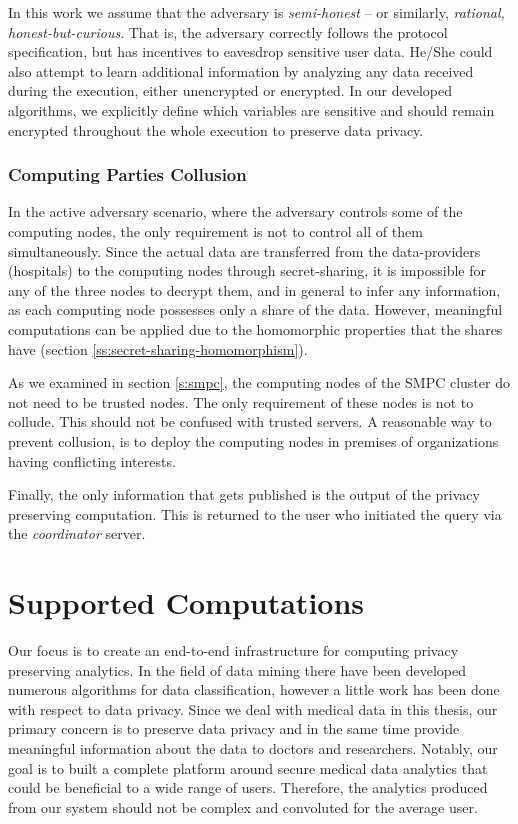 In this work we assume that the adversary is \emph{semi\hyp honest} -- or similarly, \emph{rational, honest\hyp but\hyp curious}.
That is, the adversary correctly follows the protocol specification, but has incentives to eavesdrop sensitive user data.
He/She could also attempt to learn additional information by analyzing any data received during the execution, either unencrypted or encrypted.
In our developed algorithms, we explicitly define which variables are sensitive and should remain encrypted throughout the whole execution to preserve data privacy.


\subsubsection{Computing Parties Collusion}\label{s:computing-parties-collusion}
In the active adversary scenario, where the adversary controls some of the computing nodes, the only requirement is not to control all of them simultaneously.
Since the actual data are transferred from the data-providers (hospitals) to the computing nodes through secret\hyp sharing, it is impossible for any of the three nodes to decrypt them, and in general to infer any information, as each computing node possesses only a share of the data.
However, meaningful computations can be applied due to the homomorphic properties that the shares have (section \ref{ss:secret-sharing-homomorphism}).

As we examined in section \ref{s:smpc}, the computing nodes of the SMPC cluster do not need to be trusted nodes.
The only requirement of these nodes is not to collude.
This should not be confused with trusted servers.
A reasonable way to prevent collusion, is to deploy the computing nodes in premises of organizations having conflicting interests.

Finally, the only information that gets published is the output of the privacy preserving computation.
This is returned to the user who initiated the query via the \textit{coordinator} server.



\section{Supported Computations}\label{s:computations}
Our focus is to create an end-to-end infrastructure for computing privacy preserving analytics.
In the field of data mining there have been developed numerous algorithms for data classification, however a little work has been done with respect to data privacy.
Since we deal with medical data in this thesis, our primary concern is to preserve data privacy and in the same time provide meaningful information about the data to doctors and researchers.
Notably, our goal is to built a complete platform around secure medical data analytics that could be beneficial to a wide range of users.
Therefore, the analytics produced from our system should not be complex and convoluted for the average user.

